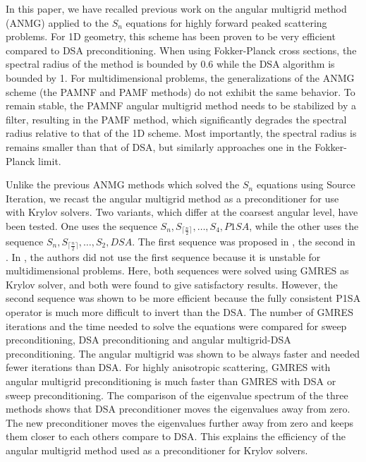\documentclass[preprint,10pt]{elsarticle}
\renewcommand{\(}{\left(}
\renewcommand{\)}{\right)}
\renewcommand{\[}{\left[}
\renewcommand{\]}{\right]}
\begin{document}
In this paper, we have recalled previous work on the angular multigrid
method (ANMG) applied to the $S_n$ equations for highly forward peaked scattering problems. 
For 1D geometry, this scheme has been proven to be very 
efficient compared to DSA preconditioning. When using Fokker-Planck cross sections, the
spectral radius of the method is bounded by 0.6 while the DSA algorithm is bounded by 1. 
For multidimensional problems, the generalizations of the ANMG scheme (the
PAMNF and PAMF methods) do not exhibit the same behavior. To remain stable, the PAMNF angular 
multigrid method needs to be stabilized by a filter, resulting in the PAMF method, which 
significantly degrades the spectral radius relative to that of the 1D scheme. Most 
importantly, the spectral radius is remains smaller than that of DSA, but similarly approaches one 
in the Fokker-Planck limit. 

Unlike the previous ANMG methods which solved the $S_n$ equations using Source 
Iteration, we recast the angular multigrid method as a preconditioner for use with Krylov solvers. 
Two variants, which differ at the coarsest angular level, have been tested. One uses the sequence 
$S_n,S_{\lceil\frac{n}{2}\rceil}, \hdots,S_4,P1SA$, while the other uses the sequence $S_n,
S_{\lceil\frac{n}{2}\rceil},\hdots,S_2,DSA$.  The first sequence was proposed in \cite{multigrid_1d}, 
the second in \cite{multigrid_2d}. In \cite{multigrid_2d}, the authors did not use the first
sequence because it is unstable for multidimensional problems. Here, both sequences were solved using 
GMRES as Krylov solver, and both were found to give satisfactory results.  However, the second sequence 
was shown to be more efficient because the fully consistent P1SA operator is much more difficult to invert 
than the DSA. The number of GMRES iterations and the time needed
to solve the equations were compared for sweep preconditioning, DSA
preconditioning and angular multigrid-DSA preconditioning. The angular
multigrid was shown to be always faster and needed fewer iterations than DSA.
For highly anisotropic scattering, GMRES with angular multigrid
preconditioning is much faster than GMRES with DSA or sweep preconditioning.
The comparison of the eigenvalue spectrum of the three methods shows that 
DSA preconditioner moves the eigenvalues away from zero. The new
preconditioner moves the eigenvalues further away from zero and keeps them
closer to each others compare to DSA. This explains the
efficiency of the angular multigrid method used as a preconditioner for Krylov solvers.
\end{document}
